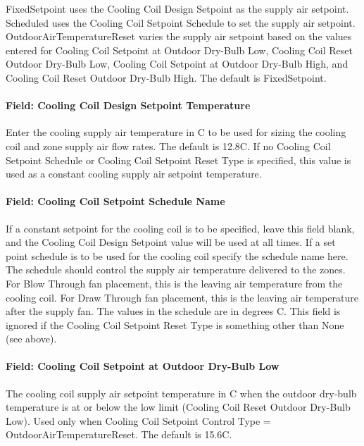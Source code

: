 FixedSetpoint uses the Cooling Coil Design Setpoint as the supply air setpoint. Scheduled uses the Cooling Coil Setpoint Schedule to set the supply air setpoint. OutdoorAirTemperatureReset varies the supply air setpoint based on the values entered for Cooling Coil Setpoint at Outdoor Dry-Bulb Low, Cooling Coil Reset Outdoor Dry-Bulb Low, Cooling Coil Setpoint at Outdoor Dry-Bulb High, and Cooling Coil Reset Outdoor Dry-Bulb High. The default is FixedSetpoint.

\paragraph{Field: Cooling Coil Design Setpoint Temperature}\label{field-cooling-coil-design-setpoint-temperature-1}

Enter the cooling supply air temperature in C to be used for sizing the cooling coil and zone supply air flow rates. The default is 12.8C. If no Cooling Coil Setpoint Schedule or Cooling Coil Setpoint Reset Type is specified, this value is used as a constant cooling supply air setpoint temperature.

\paragraph{Field: Cooling Coil Setpoint Schedule Name}\label{field-cooling-coil-setpoint-schedule-name-3}

If a constant setpoint for the cooling coil is to be specified, leave this field blank, and the Cooling Coil Design Setpoint value will be used at all times. If a set point schedule is to be used for the cooling coil specify the schedule name here. The schedule should control the supply air temperature delivered to the zones. For Blow Through fan placement, this is the leaving air temperature from the cooling coil. For Draw Through fan placement, this is the leaving air temperature after the supply fan. The values in the schedule are in degrees C. This field is ignored if the Cooling Coil Setpoint Reset Type is something other than None (see above).

\paragraph{Field: Cooling Coil Setpoint at Outdoor Dry-Bulb Low}\label{field-cooling-coil-setpoint-at-outdoor-dry-bulb-low-1}

The cooling coil supply air setpoint temperature in C when the outdoor dry-bulb temperature is at or below the low limit (Cooling Coil Reset Outdoor Dry-Bulb Low). Used only when Cooling Coil Setpoint Control Type = OutdoorAirTemperatureReset. The default is 15.6C.

